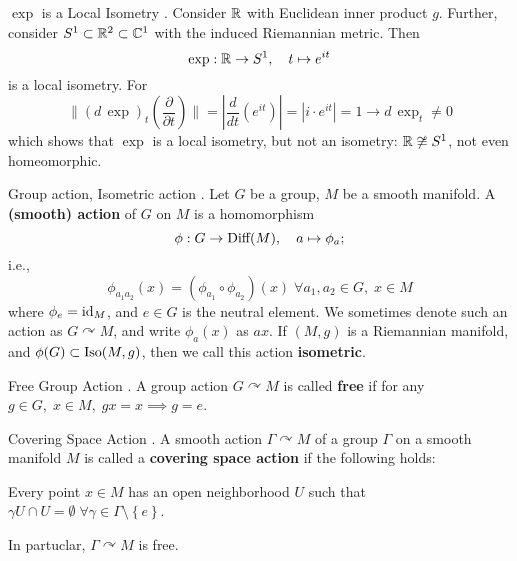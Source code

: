 \documentclass{article}
\begin{document}
\begin{Example}{$\exp$ is a Local Isometry}
.  Consider $\mathbb{R}$ with Euclidean inner product $g$. Further, consider $S^1 \subset \mathbb{R}^2 \subset \mathbb{C}^1$ with the induced Riemannian metric. Then
\begin{equation}
  \exp : \mathbb{R} \rightarrow S^1, \quad t \mapsto e^{it}
\end{equation}
is a local isometry. For
\begin{equation}
  \lVert (d \, \exp)_t \left( \frac{\partial}{\partial t} \right) \rVert = \left| \frac{d}{dt}\left( e^{it} \right) \right| = | i \cdot e^{it} | = 1 \rightarrow d \, \exp_t \neq 0
\end{equation}
  which shows that $\exp$ is a local isometry, but not an isometry: $\mathbb{R} \not\cong S^1$, not even homeomorphic.
\end{Example}

\begin{Definition}{Group action, Isometric action}
.  Let $G$ be a group, $M$ be a smooth manifold. A \textbf{(smooth) action} of $G$ on $M$ is a homomorphism
\begin{equation}
  \phi : G \rightarrow \text{\normalfont Diff}(M), \quad a \mapsto \phi_a;
\end{equation}
i.e.,
\begin{equation}
  \phi_{a_1 a_2}(x) = (\phi_{a_1} \circ \phi_{a_2})(x) \; \forall a_1, a_2 \in G, \; x \in M
\end{equation}
where $\phi_e = \text{\normalfont id}_M$, and $e \in G$ is the neutral element. We sometimes denote such an action as $G \curvearrowright M$, and write $\phi_a(x)$ as $ax$. If $(M,g)$ is a Riemannian manifold, and $\phi(G) \subset \text{\normalfont Iso}(M, g)$, then we call this action \textbf{isometric}.
\end{Definition}

\begin{Definition}{Free Group Action}
.  A group action $G \curvearrowright M$ is called \textbf{free} if for any $g \in G, \; x \in M, \; gx = x \implies g = e$.
\end{Definition}

\begin{Definition}{Covering Space Action}
  .  A smooth action $\Gamma \curvearrowright M$ of a group $\Gamma$ on a smooth manifold $M$ is called a \textbf{covering space action} if the following holds:

  Every point $x \in M$ has an open neighborhood $U$ such that $\gamma U \cap U = \emptyset \; \forall \gamma \in \Gamma \setminus \left\{ e \right\}$.

  In partuclar, $\Gamma \curvearrowright M$ is free.
\end{Definition}
\end{document}
